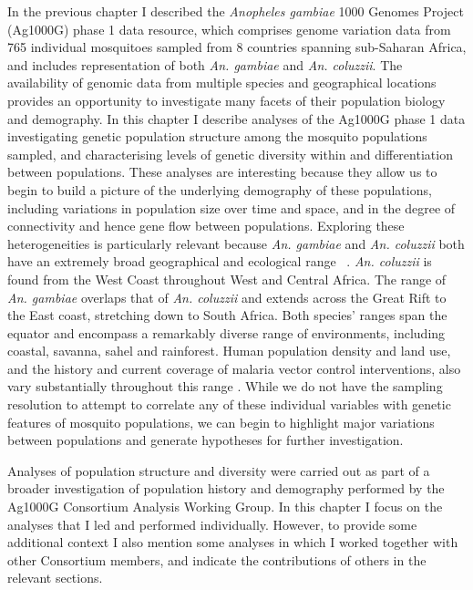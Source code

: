\documentclass[a4paper,11pt,abstracton,hidelinks]{scrartcl}
\begin{document}
%
In the previous chapter I described the \textit{Anopheles gambiae} 1000 Genomes Project (Ag1000G) phase 1 data resource, which comprises genome variation data from 765 individual mosquitoes sampled from 8 countries spanning sub-Saharan Africa, and includes representation of both \textit{An. gambiae} and \textit{An. coluzzii}.
%
The availability of genomic data from multiple species and geographical locations provides an opportunity to investigate many facets of their population biology and demography.
%
In this chapter I describe analyses of the Ag1000G phase 1 data investigating genetic population structure among the mosquito populations sampled, and characterising levels of genetic diversity within and differentiation between populations.
%
These analyses are interesting because they allow us to begin to build a picture of the underlying demography of these populations, including variations in population size over time and space, and in the degree of connectivity and hence gene flow between populations.
%
Exploring these heterogeneities is particularly relevant because \textit{An. gambiae} and \textit{An. coluzzii} both have an extremely broad geographical and ecological range ~\parencite{dellaTorre2001,TeneFossog2015,Wiebe2017}.
%
\textit{An. coluzzii} is found from the West Coast throughout West and Central Africa.
%
The range of \textit{An. gambiae} overlaps that of \textit{An. coluzzii} and extends across the Great Rift to the East coast, stretching down to South Africa.
%
Both species' ranges span the equator and encompass a remarkably diverse range of environments, including coastal, savanna, sahel and rainforest.
%
Human population density and land use, and the history and current coverage of malaria vector control interventions, also vary substantially throughout this range \parencite{WHO2019WMR}.
%
While we do not have the sampling resolution to attempt to correlate any of these individual variables with genetic features of mosquito populations, we can begin to highlight major variations between populations and generate hypotheses for further investigation.
%


Analyses of population structure and diversity were carried out as part of a broader investigation of population history and demography performed by the Ag1000G Consortium Analysis Working Group.
%
In this chapter I focus on the analyses that I led and performed individually.
%
However, to provide some additional context I also mention some analyses in which I worked together with other Consortium members, and indicate the contributions of others in the relevant sections.
\end{document}
